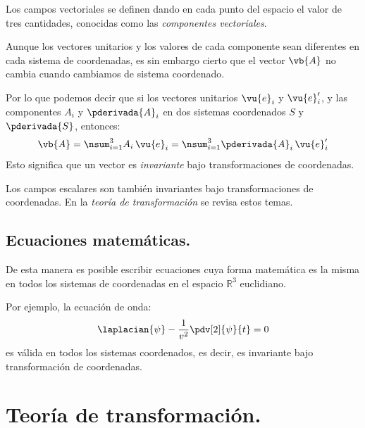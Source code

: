 Los campos vectoriales se definen dando en cada punto del espacio el valor de tres cantidades, conocidas como las \emph{componentes vectoriales}.
\par
Aunque los vectores unitarios y los valores de cada componente sean diferentes en cada sistema de coordenadas, es sin embargo cierto que el vector $\vb{A}$ no cambia cuando cambiamos de sistema coordenado.
\par
Por lo que podemos decir que si los vectores unitarios $\vu{e}_{i}$ y $\vu{e}_{i}^{\prime}$, y las componentes $A_{i}$ y $\pderivada{A}_{i}$ en dos sistemas coordenados $S$ y $\pderivada{S}$, entonces:
\begin{align*}
\vb{A} = \nsum_{i=1}^{3} A_{i} \, \vu{e}_{i} = \nsum_{i=1}^{3} \pderivada{A}_{i} \, \vu{e}_{i}^{\prime}
\end{align*}
Esto significa que un vector es \emph{invariante} bajo transformaciones de coordenadas.
\par
Los campos escalares son también invariantes bajo transformaciones de coordenadas. En la \emph{teoría de transformación} se revisa estos temas.

\subsection*{Ecuaciones matemáticas.}

De esta manera es posible escribir ecuaciones cuya forma matemática es la misma en todos los sistemas de coordenadas en el espacio $\mathbb{R}^{3}$ euclidiano.
\par
Por ejemplo, la ecuación de onda:
\begin{align*}
\laplacian{\psi} - \dfrac{1}{v^{2}} \pdv[2]{\psi}{t} = 0
\end{align*}
es válida en todos los sistemas coordenados, es decir, es invariante bajo transformación de coordenadas.

\section{Teoría de transformación.}

